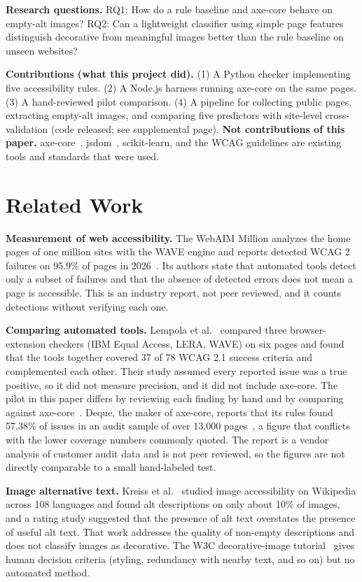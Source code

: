 \documentclass[sigconf,anonymous]{acmart}
\begin{document}
\textbf{Research questions.} RQ1: How do a rule baseline and axe-core behave on empty-alt images? RQ2: Can a lightweight classifier using simple page features distinguish decorative from meaningful images better than the rule baseline on unseen websites? 

\textbf{Contributions (what this project did).} (1) A Python checker implementing five accessibility rules. (2) A Node.js harness running axe-core on the same pages. (3) A hand-reviewed pilot comparison. (4) A pipeline for collecting public pages, extracting empty-alt images, and comparing five predictors with site-level cross-validation (code released; see supplemental page).
\textbf{Not contributions of this paper.} axe-core~\cite{axecore}, jsdom~\cite{jsdom}, scikit-learn, and the WCAG guidelines are existing tools and standards that were used.

\section{Related Work}
\textbf{Measurement of web accessibility.} The WebAIM Million analyzes the home pages of one million sites with the WAVE engine and reports detected WCAG 2 failures on 95.9\% of pages in 2026~\cite{webaim2026}. Its authors state that automated tools detect only a subset of failures and that the absence of detected errors does not mean a page is accessible. This is an industry report, not peer reviewed, and it counts detections without verifying each one.

\textbf{Comparing automated tools.} Lempola et al.~\cite{lempola2024} compared three browser-extension checkers (IBM Equal Access, LERA, WAVE) on six pages and found that the tools together covered 37 of 78 WCAG 2.1 success criteria and complemented each other. Their study assumed every reported issue was a true positive, so it did not measure precision, and it did not include axe-core. The pilot in this paper differs by reviewing each finding by hand and by comparing against axe-core~\cite{axecore}. Deque, the maker of axe-core, reports that its rules found 57.38\% of issues in an audit sample of over 13{,}000 pages~\cite{deque2025}, a figure that conflicts with the lower coverage numbers commonly quoted. The report is a vendor analysis of customer audit data and is not peer reviewed, so the figures are not directly comparable to a small hand-labeled test.

\textbf{Image alternative text.} Kreiss et al.~\cite{kreiss2023} studied image accessibility on Wikipedia across 108 languages and found alt descriptions on only about 10\% of images, and a rating study suggested that the presence of alt text overstates the presence of useful alt text. That work addresses the quality of non-empty descriptions and does not classify images as decorative. The W3C decorative-image tutorial~\cite{w3cdecorative} gives human decision criteria (styling, redundancy with nearby text, and so on) but no automated method.
\end{document}
